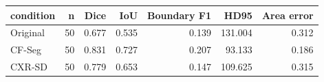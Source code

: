 \begin{tabular}{lrrrrrr}
\toprule
condition & n & Dice & IoU & Boundary F1 & HD95 & Area error \\
\midrule
Original & 50 & 0.677 & 0.535 & 0.139 & 131.004 & 0.312 \\
CF-Seg & 50 & 0.831 & 0.727 & 0.207 & 93.133 & 0.186 \\
CXR-SD & 50 & 0.779 & 0.653 & 0.147 & 109.625 & 0.315 \\
\bottomrule
\end{tabular}
